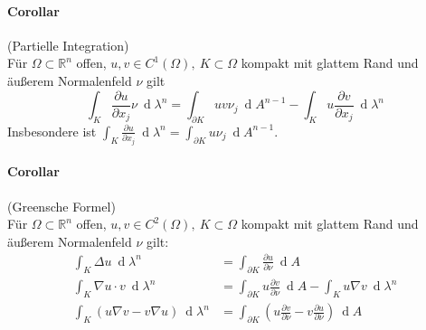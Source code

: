 \documentclass[12pt,a4paper,fleqn]{article}
\def\R{{\mathbb{R}}}
\def\d{{\operatorname{d}}}
\begin{document}
\paragraph{Corollar} (Partielle Integration)\\
Für $\Omega \subset \R^n$ offen, $u, v \in C^1(\Omega),\ K\subset\Omega$ kompakt mit glattem Rand und äußerem Normalenfeld $\nu$ gilt
\begin{displaymath}
\int_K\frac{\partial u}{\partial x_j} \nu\ \d\lambda^n = \int_{\partial K} uv\nu_j\ \d A^{n-1} - \int_K u\frac{\partial v}{\partial x_j}\ \d\lambda^n
\end{displaymath}
Insbesondere ist $\int_K \frac{\partial u}{\partial x_j}\ \d\lambda^n = \int_{\partial K} u\nu_j\ \d A^{n-1}$.

\paragraph{Corollar} (Greensche Formel)\\
Für $\Omega \subset \R^n$ offen, $u, v \in C^2(\Omega),\ K\subset \Omega$ kompakt mit glattem Rand und äußerem Normalenfeld $\nu$ gilt:
\begin{align*}
\int_K  \Delta u\ \d\lambda^n &= \int_{\partial K} \frac{\partial u}{\partial \nu}\ \d A\\
\int_K \nabla u \cdot v\ \d\lambda^n &= \int_{\partial K} u\frac{\partial v}{\partial \nu}\ \d A - \int_K u\nabla v\ \d\lambda^n\\
\int_K(u\nabla v - v\nabla u)\ \d\lambda^n &= \int_{\partial K} \left(u\frac{\partial v}{\partial \nu} - v\frac{\partial u}{\partial \nu}\right)\ \d A
\end{align*}
\end{document}
